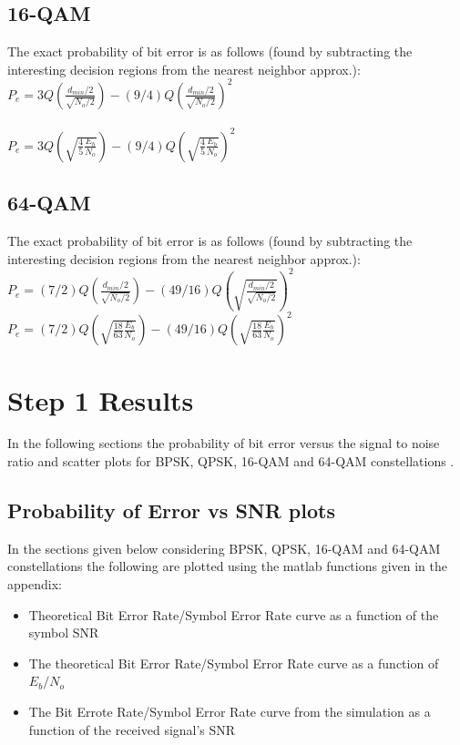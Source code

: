 \documentclass[]{article}
\begin{document}
\subsection{16-QAM}
\label{sec:qam16}

The exact probability of bit error is as follows (found by subtracting the interesting decision regions from the nearest neighbor approx.):\\

$ P_e = 3Q(\frac{d_{min}/2}{\sqrt{N_o/2}})-(9/4)Q(\frac{d_{min}/2}{\sqrt{N_o/2}})^2$ \\
\\
$ P_e = 3Q(\sqrt{\frac{4}{5}\frac{E_b}{N_o}})-(9/4)Q(\sqrt{\frac{4}{5}\frac{E_{b}}{N_o}})^2$  \\

\subsection{64-QAM}
\label{sec:qam64}
The exact probability of bit error is as follows (found by subtracting the interesting decision regions from the nearest neighbor approx.):\\

$P_e = (7/2)Q(\frac{d_{min}/2}{\sqrt{N_o/2}}) -(49/16)Q(\sqrt{\frac{d_{min}/2}{\sqrt{N_o/2}}})^2$ \\

$P_e = (7/2)Q(\sqrt{\frac{18}{63}\frac{E_b}{N_o}})-(49/16)Q(\sqrt{\frac{18}{63}\frac{E_b}{N_o}})^2$ \\



\section{Step 1 Results}

In the following sections the probability of bit error versus the signal to noise ratio and scatter plots for BPSK, QPSK, 16-QAM and 64-QAM constellations .

\subsection{Probability of Error vs SNR plots}
In the sections given below considering BPSK, QPSK, 16-QAM and 64-QAM constellations the following  are plotted using the matlab functions given in the appendix:
\begin{itemize}
\item Theoretical Bit Error Rate/Symbol Error Rate curve as a function of the symbol SNR
\item The theoretical Bit Error Rate/Symbol Error Rate curve as a function of $E_b/N_o$
\item The Bit Errote Rate/Symbol Error Rate curve from the simulation as a function of the received signal's SNR
\end{itemize}
\end{document}
